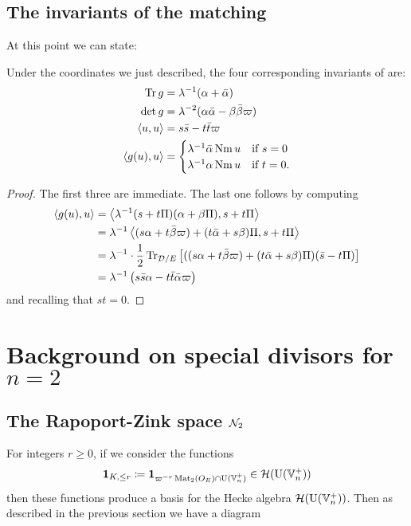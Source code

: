 \subsection{The invariants of the matching}
At this point we can state:
\begin{lemma}
  \label{lem:g_u_invariants}
  Under the coordinates we just described,
  the four corresponding invariants of  are:
  \begin{align*}
    \operatorname{Tr} g &= \lambda^{-1} (\alpha + \bar \alpha) \\
    \det g &= \lambda^{-2} (\alpha \bar \alpha - \beta \bar\beta \varpi) \\
    \left\langle u,u \right\rangle &= s \bar s - t \bar t \varpi \\
    \left\langle g(u), u \right\rangle &= \begin{cases}
        \lambda^{-1} \bar\alpha \operatorname{Nm} u & \text{if } s = 0 \\
        \lambda^{-1} \alpha \operatorname{Nm} u & \text{if } t = 0.
      \end{cases}
  \end{align*}
\end{lemma}
\begin{proof}
  The first three are immediate.
  The last one follows by computing
  \begin{align*}
    \left\langle g(u), u \right\rangle
    &= \left\langle \lambda^{-1}(s + t \Pi)(\alpha + \beta \Pi), s + t \Pi \right\rangle \\
    &= \lambda^{-1} \left\langle
      (s \alpha + t \bar \beta \varpi) + (t \bar \alpha + s \beta) \Pi,
      s + t \Pi \right\rangle \\
    &= \lambda^{-1} \cdot \frac{1}{2} \operatorname{Tr}_{\mathcal D/E} \left[
      ((s \alpha + t \bar \beta \varpi) + (t \bar \alpha + s \beta) \Pi)
      (\bar s - t \Pi) \right] \\
    &= \lambda^{-1} \left( s \bar s \alpha - t \bar t \bar \alpha \varpi \right)
  \end{align*}
  and recalling that $s t = 0$.
\end{proof}

\section{Background on special divisors for $n = 2$}
\subsection{The Rapoport-Zink space $\mathcal N_2$}
For integers $r \ge 0$, if we consider the functions
\[ \mathbf{1}_{K, \le r} \coloneqq \mathbf{1}_{\varpi^{-r} \operatorname{Mat}_2(O_E) \cap \operatorname{U}(\mathbb V_n^+)} \in \mathcal H(\operatorname{U}(\mathbb V_n^+)) \]
then these functions produce a basis for the Hecke algebra $\mathcal H(\operatorname{U}(\mathbb V_n^+))$.
Then as described in the previous section we have a diagram
\begin{center}
\end{center}

